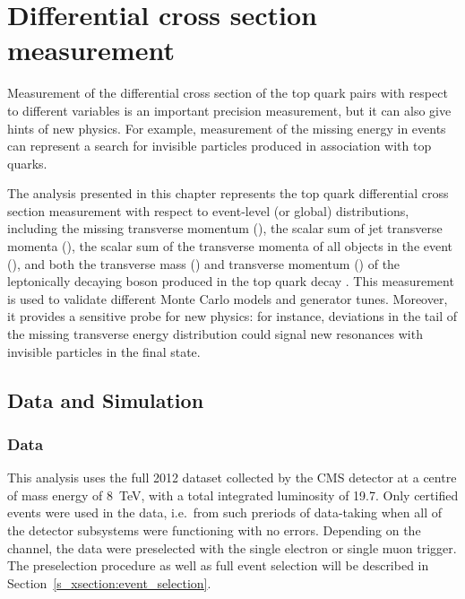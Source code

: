 
\chapter[Differential cross section measurement]{Differential cross section measurement}
\label{c:xsection_analysis}
\ifpdf
    \graphicspath{{06_Cross_section_analysis/plots/}}
\else
    \graphicspath{{06_Cross_section_analysis/plots/EPS/}{06_Cross_section_analysis/plots/}}
\fi

Measurement of the differential cross section of the top quark pairs with respect to different variables is an important
precision measurement, but it can also give hints of new physics. For example, measurement of the missing energy in
\ttbar events can represent a search for invisible particles produced in association with top quarks.

The analysis presented in this chapter represents the top quark differential cross section measurement with respect to
event-level (or global) distributions, including the missing transverse momentum (\MET), the scalar sum of jet
transverse momenta (\HT), the scalar sum of the transverse momenta of all objects in the event (\ST), and both the
transverse mass (\MT) and transverse momentum (\WPT) of the leptonically decaying \W boson produced in the top quark
decay \autocite{xsection_PAS_7TeV, xsection_PAS_8TeV}. This measurement is used to validate different Monte Carlo models
and generator tunes. Moreover, it provides a sensitive probe for new physics: for instance, deviations in the tail of
the missing transverse energy distribution could signal new resonances with invisible particles in the final state.

\section{Data and Simulation}
\label{s_xsection:data_and_simulation}

\subsection{Data}
\label{ss_xsection:data}
This analysis uses the full 2012 dataset collected by the CMS detector at a centre of mass energy of \SI{8}{\TeV}, with
a total integrated luminosity of \SI{19.7}{\fbinv}. Only certified events were used in the data, i.e.\ from such
preriods of data-taking when all of the detector subsystems were functioning with no errors. Depending on the channel,
the data were preselected with the single electron or single muon trigger. The preselection procedure as well as full
event selection will be described in Section~\ref{s_xsection:event_selection}.

